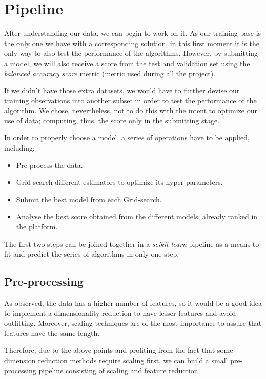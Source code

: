 \documentclass[letterpaper,11pt]{article}
\begin{document}
\section{Pipeline}

After understanding our data, we can begin to work on it. As our training base is the only one we have with a corresponding solution, in this first moment it is the only way to also test the performance of the algorithms. However, by submitting a model, we will also receive a score from the test and validation set using the \textit{balanced accuracy score} metric (metric used during all the project).

If we didn't have those extra datasets, we would have to further devise our training observations into another subset in order to test the performance of the algorithm. We chose, nevertheless, not to do this with the intent to optimize our use of data; computing, thus, the score only in the submitting stage.

In order to properly choose a model, a series of operations have to be applied, including:
\begin{itemize}
    \item Pre-process the data.
    \item Grid-search different estimators to optimize its hyper-parameters.
    \item Submit the best model from each Grid-search.
    \item Analyse the best score obtained from the different models, already ranked in the platform.
\end{itemize}

The first two steps can be joined together in a \textit{scikit-learn} pipeline as a means to fit and predict the series of algorithms in only one step.

\subsection{Pre-processing}
As observed, the data has a higher number of features, so it would be a good idea to implement a dimensionality reduction to have lesser features and avoid outfitting. Moreover, scaling techniques are of the most importance to assure that features have the same length.

Therefore, due to the above points and profiting from the fact that some dimension reduction methods require scaling first, we can build a small pre-processing pipeline consisting of scaling and feature reduction.
\end{document}
